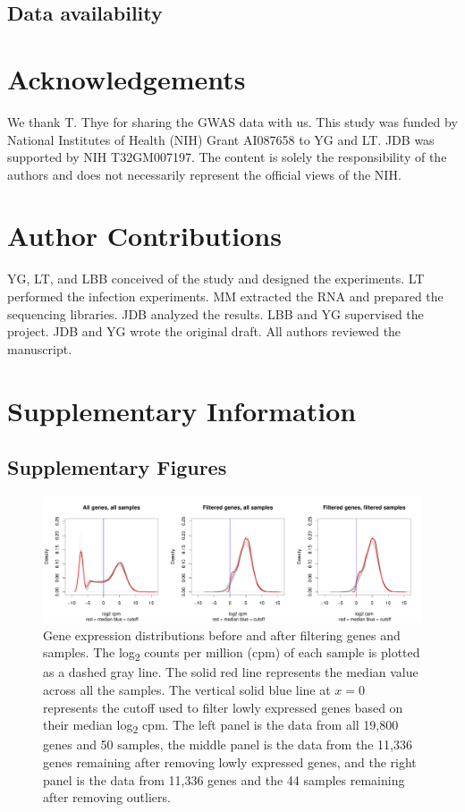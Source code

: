 \documentclass[fleqn,10pt]{wlscirep}
\newcommand{\beginsupplement}{%
 \setcounter{table}{0}
 \renewcommand{\thetable}{S\arabic{table}}%
 \setcounter{figure}{0}
 \renewcommand{\thefigure}{S\arabic{figure}}%
 }
\begin{document}
\subsection*{Data availability}

\section*{Acknowledgements}

We thank T. Thye for sharing the GWAS data with us. This study was funded by National Institutes of Health (NIH) Grant AI087658 to YG and LT. JDB was supported by NIH T32GM007197. The content is solely the responsibility of the authors and does not necessarily represent the official views of the NIH.
\section*{Author Contributions}

YG, LT, and LBB conceived of the study and designed the experiments. LT performed the infection experiments. MM extracted the RNA and prepared the sequencing libraries. JDB analyzed the results. LBB and YG supervised the project. JDB and YG wrote the original draft. All authors reviewed the manuscript.




\clearpage\newpage
\beginsupplement
\section*{Supplementary Information}

\subsection*{Supplementary Figures}


\begin{figure}[ht]
\centering
\includegraphics[width=\linewidth]{../figure/gene-exp-distribution.pdf}
\caption{
Gene expression distributions before and after filtering genes and samples. The log\textsubscript{2} counts per million (cpm) of each sample is plotted as a dashed gray line. The solid red line represents the median value across all the samples. The vertical solid blue line at $x = 0$ represents the cutoff used to filter lowly expressed genes based on their median log\textsubscript{2} cpm. The left panel is the data from all 19,800 genes and 50 samples, the middle panel is the data from the 11,336 genes remaining after removing lowly expressed genes, and the right panel is the data from 11,336 genes and the 44 samples remaining after removing outliers.
}
\label{fig:gene}
\end{figure}
\end{document}

